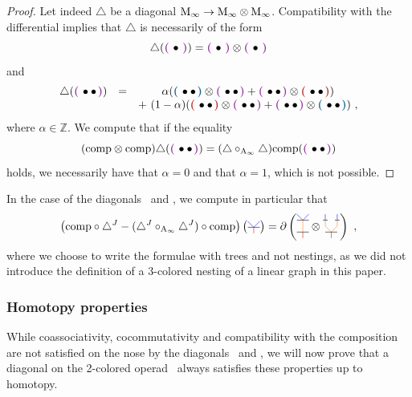 \documentclass[twoside, 12pt]{amsart}
\theoremstyle{remark}
\begin{document}
\begin{proof} 
  Let indeed $\triangle$ be a diagonal $\mathrm{M}_\infty \rightarrow \mathrm{M}_\infty \otimes \mathrm{M}_\infty$.
  Compatibility with the differential implies that $\triangle$ is necessarily of the form
  \[
      \triangle(\purple{\bullet }) = \purple{\bullet } \otimes \purple{\bullet } \]
and
\[ \begin{matrix}
      \triangle (\purple{\bullet \bullet }) &= &\alpha (\blue{\bullet \bullet }\otimes \purple{\bullet \bullet } + \purple{\bullet \bullet }\otimes\red{\bullet \bullet }) \\ & &+ \ (1-\alpha)(\red{\bullet \bullet }\otimes \purple{\bullet \bullet }+\purple{\bullet \bullet}\otimes \blue{\bullet \bullet}) \ ,
  \end{matrix} \]
  where $\alpha \in \mathbb{Z}$.
  We compute that if the equality
  \[ ( \comp \otimes \comp ) \triangle ( \purple{\bullet \bullet} ) = (\triangle \circ_{\Ainf} \triangle ) \comp  ( \purple{\bullet \bullet} ) \]
  holds, we necessarily have that $\alpha = 0$ and that $\alpha =1$, which is not possible.
\end{proof}

\noindent In the case of the diagonals \diagainf\ and \diagminf , we compute in particular that 
  \[ \left( \comp  \circ \diagminf - (\diagminf \circ_{\Ainf} \diagminf ) \circ \comp \right) \left( \arbreopdeuxmorph  \right) = \partial \left( \arbreopcompun \otimes \arbreopcompdeux \right)  \ , \]
where we choose to write the formulae with trees and not nestings, as we did not introduce the definition of a 3-colored nesting of a linear graph in this paper.

\subsubsection{Homotopy properties}

While coassociativity, cocommutativity and compatibility with the composition are not satisfied on the nose by the diagonals \diagainf\ and \diagminf , we will now prove that a diagonal on the 2-colored operad \Ainfdeux\ always satisfies these properties up to homotopy.
\end{document}
